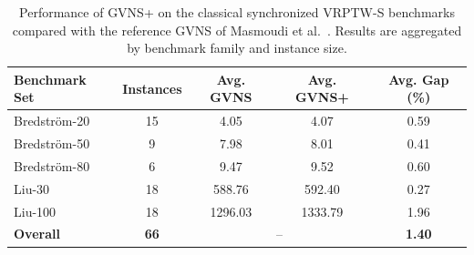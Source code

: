 \begin{table}[ht]
\centering
\caption{Performance of GVNS+ on the classical synchronized VRPTW-S benchmarks compared with the reference GVNS of Masmoudi et al.~\cite{masmoudi2025generalized}. Results are aggregated by benchmark family and instance size.}
\label{tab:gvns_plus_classical}
\small
\setlength{\tabcolsep}{5pt}
\begin{tabular}{lcccc}
\toprule
Benchmark Set &
Instances &
Avg. GVNS &
Avg. GVNS+ &
Avg. Gap (\%) \\
\midrule
Bredström-20  & 15 & 4.05 & 4.07 & 0.59 \\
Bredström-50  & 9  & 7.98 & 8.01 & 0.41 \\
Bredström-80  & 6  & 9.47 & 9.52 & 0.60 \\
\midrule
Liu-30        & 18 & 588.76 & 592.40 & 0.27 \\
Liu-100       & 18 & 1296.03 & 1333.79 & 1.96 \\
\midrule
\textbf{Overall} & \textbf{66} &
\multicolumn{2}{c}{--} &
\textbf{1.40} \\
\bottomrule
\end{tabular}
\end{table}